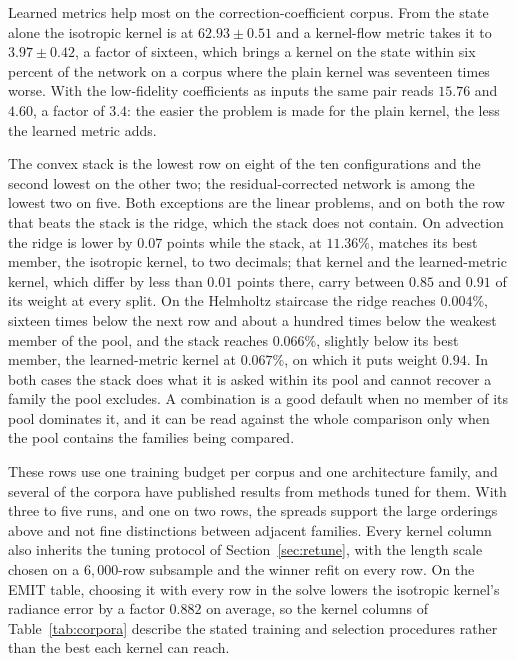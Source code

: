 Learned metrics help most on the correction-coefficient corpus. From the state alone the isotropic
kernel is at $62.93 \pm 0.51$ and a kernel-flow metric \cite{owhadiyoo} takes it to $3.97 \pm 0.42$,
a factor of sixteen, which brings a kernel on the state within six percent of the network on a
corpus where the plain kernel was seventeen times worse. With the low-fidelity coefficients as
inputs the same pair reads $15.76$ and $4.60$, a factor of $3.4$: the easier the problem is made for
the plain kernel, the less the learned metric adds.

The convex stack is the lowest row on eight of the ten configurations and the second lowest on the
other two; the residual-corrected network is among the lowest two on five. Both exceptions are the
linear problems, and on both the row that beats the stack is the ridge, which the stack does not
contain. On advection the ridge is lower by $0.07$ points while the stack, at $11.36\%$, matches its
best member, the isotropic kernel, to two decimals; that kernel and the learned-metric kernel, which
differ by less than $0.01$ points there, carry between $0.85$ and $0.91$ of its weight at every
split. On the Helmholtz
staircase the ridge reaches $0.004\%$, sixteen times below the next row and about a hundred times
below the weakest member of the pool, and the stack reaches $0.066\%$, slightly below its best member,
the learned-metric kernel at $0.067\%$, on which it puts weight $0.94$. In both cases the stack does
what it is asked within its pool and cannot recover a family the pool excludes. A combination is a
good default when no member of its pool dominates it, and it can be read against the whole
comparison only when the pool contains the families being compared.

These rows use one training budget per corpus and one architecture family, and several of the
corpora have published results from methods tuned for them. With three to five runs, and one on two
rows, the spreads support the large orderings above and not fine distinctions between adjacent
families. Every kernel column also inherits the tuning protocol of Section~\ref{sec:retune}, with
the length scale chosen on a $6{,}000$-row subsample and the winner refit on every row. On the EMIT
table, choosing it with every row in the solve lowers the isotropic kernel's radiance error by a
factor $0.882$ on average, so the kernel columns of Table~\ref{tab:corpora} describe the stated
training and selection procedures rather than the best each kernel can reach.

